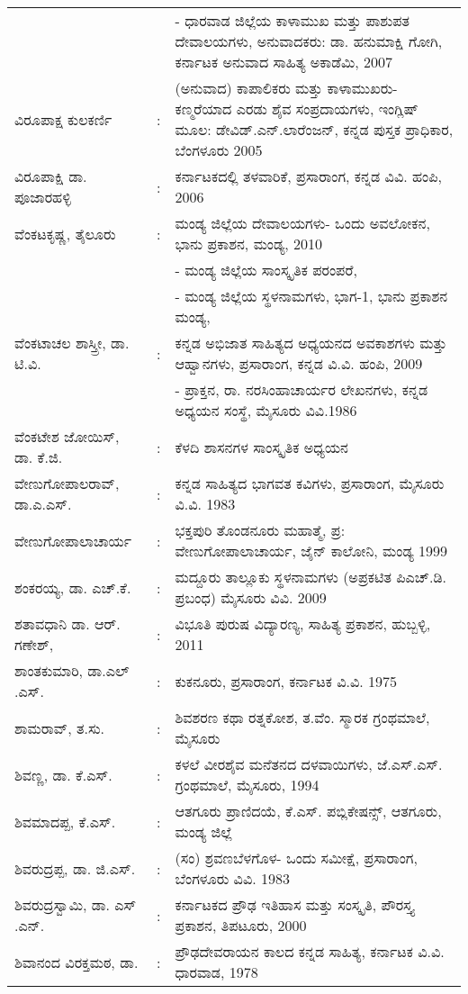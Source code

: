\begin{longtable}[l]{@{}>{\raggedright}p{4.7cm}cp{9.2cm}<{\raggedright}@{}}
&& - ಧಾರವಾಡ ಜಿಲ್ಲೆಯ ಕಾಳಾಮುಖ ಮತ್ತು ಪಾಶುಪತ ದೇವಾಲಯಗಳು, ಅನುವಾದಕರು: ಡಾ. ಹನುಮಾಕ್ಷಿ ಗೋಗಿ, ಕರ್ನಾಟಕ ಅನುವಾದ ಸಾಹಿತ್ಯ ಅಕಾಡೆಮಿ, 2007\\
ವಿರೂಪಾಕ್ಷ ಕುಲಕರ್ಣಿ & : & (ಅನುವಾದ) ಕಾಪಾಲಿಕರು ಮತ್ತು ಕಾಳಾಮುಖರು-ಕಣ್ಮರೆಯಾದ ಎರಡು ಶೈವ ಸಂಪ್ರದಾಯಗಳು, ಇಂಗ್ಲಿಷ್​ ಮೂಲ: ಡೇವಿಡ್​.ಎನ್​.ಲಾರೆಂಜನ್​, ಕನ್ನಡ ಪುಸ್ತಕ ಪ್ರಾಧಿಕಾರ, ಬೆಂಗಳೂರು 2005\\
ವಿರೂಪಾಕ್ಷಿ ಡಾ. ಪೂಜಾರಹಳ್ಳಿ & : &  ಕರ್ನಾಟಕದಲ್ಲಿ ತಳವಾರಿಕೆ, ಪ್ರಸಾರಾಂಗ, ಕನ್ನಡ ವಿವಿ. ಹಂಪಿ, 2006\\
ವೆಂಕಟಕೃಷ್ಣ, ತೈಲೂರು & : & ಮಂಡ್ಯ ಜಿಲ್ಲೆಯ ದೇವಾಲಯಗಳು- ಒಂದು ಅವಲೋಕನ, ಭಾನು ಪ್ರಕಾಶನ, ಮಂಡ್ಯ, 2010\\
&& - ಮಂಡ್ಯ ಜಿಲ್ಲೆಯ ಸಾಂಸ್ಕೃತಿಕ ಪರಂಪರೆ,\\
&& - ಮಂಡ್ಯ ಜಿಲ್ಲೆಯ ಸ್ಥಳನಾಮಗಳು, ಭಾಗ-1, ಭಾನು ಪ್ರಕಾಶನ ಮಂಡ್ಯ,\\
ವೆಂಕಟಾಚಲ ಶಾಸ್ತ್ರೀ, ಡಾ. ಟಿ.ವಿ. & : & ಕನ್ನಡ ಅಭಿಜಾತ ಸಾಹಿತ್ಯದ ಅಧ್ಯಯನದ ಅವಕಾಶಗಳು ಮತ್ತು ಆಹ್ವಾನಗಳು, ಪ್ರಸಾರಾಂಗ, ಕನ್ನಡ ವಿ.ವಿ. ಹಂಪಿ, 2009\\
&& - ಪ್ರಾಕ್ತನ, ರಾ. ನರಸಿಂಹಾಚಾರ್ಯರ ಲೇಖನಗಳು, ಕನ್ನಡ ಅಧ್ಯಯನ ಸಂಸ್ಥೆ, ಮೈಸೂರು ವಿವಿ.1986\\
ವೆಂಕಟೇಶ ಜೋಯಿಸ್​, ಡಾ. ಕೆ.ಜಿ. & : & ಕೆಳದಿ ಶಾಸನಗಳ ಸಾಂಸ್ಕೃತಿಕ ಅಧ್ಯಯನ\\
ವೇಣುಗೋಪಾಲರಾವ್​, ಡಾ.ಎ.ಎಸ್​. & : & ಕನ್ನಡ ಸಾಹಿತ್ಯದ ಭಾಗವತ ಕವಿಗಳು, ಪ್ರಸಾರಾಂಗ, ಮೈಸೂರು ವಿ.ವಿ. 1983\\
ವೇಣುಗೋಪಾಲಾಚಾರ್ಯ & : & ಭಕ್ತಪುರಿ ತೊಂಡನೂರು ಮಹಾತ್ಮೆ, ಪ್ರ: ವೇಣುಗೋಪಾಲಾಚಾರ್ಯ, ಜೈನ್​ ಕಾಲೋನಿ, ಮಂಡ್ಯ 1999\\
ಶಂಕರಯ್ಯ, ಡಾ. ಎಚ್​.ಕೆ. & : & ಮದ್ದೂರು ತಾಲ್ಲೂಕು ಸ್ಥಳನಾಮಗಳು (ಅಪ್ರಕಟಿತ ಪಿಎಚ್​.ಡಿ. ಪ್ರಬಂಧ) ಮೈಸೂರು ವಿವಿ. 2009\\
ಶತಾವಧಾನಿ ಡಾ. ಆರ್​. ಗಣೇಶ್​, & : & ವಿಭೂತಿ ಪುರುಷ ವಿದ್ಯಾರಣ್ಯ, ಸಾಹಿತ್ಯ ಪ್ರಕಾಶನ, ಹುಬ್ಬಳ್ಳಿ, 2011\\
ಶಾಂತಕುಮಾರಿ, ಡಾ.ಎಲ್​.ಎಸ್​. & : & ಕುಕನೂರು, ಪ್ರಸಾರಾಂಗ, ಕರ್ನಾಟಕ ವಿ.ವಿ. 1975\\
ಶಾಮರಾವ್​, ತ.ಸು. & : & ಶಿವಶರಣ ಕಥಾ ರತ್ನಕೋಶ, ತ.ವೆಂ. ಸ್ಮಾರಕ ಗ್ರಂಥಮಾಲೆ, ಮೈಸೂರು\\
ಶಿವಣ್ಣ, ಡಾ. ಕೆ.ಎಸ್​. & : &  ಕಳಲೆ ವೀರಶೈವ ಮನೆತನದ ದಳವಾಯಿಗಳು, ಜೆ.ಎಸ್​.ಎಸ್​. ಗ್ರಂಥಮಾಲೆ, ಮೈಸೂರು, 1994\\
ಶಿವಮಾದಪ್ಪ, ಕೆ.ಎಸ್​. & : & ಆತಗೂರು ಪ್ರಾಣಿದಯೆ, ಕೆ.ಎಸ್​. ಪಬ್ಲಿಕೇಷನ್ಸ್​, ಆತಗೂರು, ಮಂಡ್ಯ ಜಿಲ್ಲೆ\\
ಶಿವರುದ್ರಪ್ಪ, ಡಾ. ಜಿ.ಎಸ್​. & : &  (ಸಂ) ಶ್ರವಣಬೆಳಗೊಳ- ಒಂದು ಸಮೀಕ್ಷೆ, ಪ್ರಸಾರಾಂಗ, ಬೆಂಗಳೂರು ವಿವಿ. 1983\\
ಶಿವರುದ್ರಸ್ವಾಮಿ, ಡಾ. ಎಸ್​.ಎನ್​. & : & ಕರ್ನಾಟಕದ ಪ್ರೌಢ ಇತಿಹಾಸ ಮತ್ತು ಸಂಸ್ಕೃತಿ, ಪೌರಸ್ತ್ಯ ಪ್ರಕಾಶನ, ತಿಪಟೂರು, 2000\\
ಶಿವಾನಂದ ವಿರಕ್ತಮಠ, ಡಾ. & : &  ಪ್ರೌಢದೇವರಾಯನ ಕಾಲದ ಕನ್ನಡ ಸಾಹಿತ್ಯ, ಕರ್ನಾಟಕ ವಿ.ವಿ. ಧಾರವಾಡ, 1978\\

\end{longtable}
